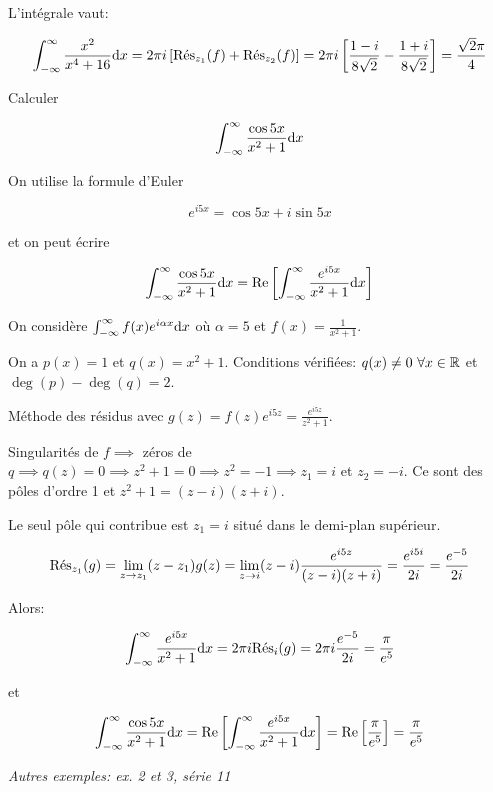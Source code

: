 \begin{enumerate}
\begin{example}[1]
L'intégrale vaut:

\[
    \int_{-\infty}^\infty \frac{x^2}{x^4 + 16} \dx
    = 2 \pi i \left[ \Res_{z_1}(f) + \Res_{z_2}(f) \right]
    = 2 \pi i \left[ \frac{1 - i}{8\sqrt{2}} - \frac{1 + i}{8\sqrt{2}} \right] = \frac{\sqrt{2}\pi}{4}
\]

\end{example}


\begin{example}[2]
    Calculer
    
    \[ \int_{-\infty}^\infty \frac{\cos 5x}{x^2 + 1} \dx \]
    
    On utilise la formule d'Euler
    
    \[ e^{i5x} = \cos 5x + i \sin 5x \]
    
    et on peut écrire
    
    \[
        \int_{-\infty}^\infty \frac{\cos 5x}{x^2 + 1} \dx
        = \Rep \left[ \int_{-\infty}^\infty \frac{e^{i5x}}{x^2 + 1} \dx \right]
    \]
    
    On considère $\int_{-\infty}^\infty f(x) e^{i\alpha x} \dx$ où $\alpha = 5$ et $f(x) = \frac{1}{x^2 + 1}$.
    
    On a $p(x) = 1$ et $q(x) = x^2 + 1$.
    Conditions vérifiées: $q(x) \neq 0 \ \forall x \in \R$ et $\deg(p) - \deg(q) = 2$.
    
    Méthode des résidus avec $g(z) = f(z) e^{i5z} = \frac{e^{i5z}}{z^2 + 1}$.
    
    Singularités de $f \implies$ zéros de $q \implies q(z) = 0 \implies z^2 + 1 = 0 \implies z^2 = -1 \implies z_1 = i$ et $z_2 = -i$.
    Ce sont des pôles d'ordre 1 et $z^2 + 1 = (z - i)(z + i)$.
    
    Le seul pôle qui contribue est $z_1 = i$ situé dans le demi-plan supérieur.
    
    \[
        \Res_{z_1}(g)
        = \lim_{z \rightarrow z_1} (z - z_1) g(z)
        = \lim_{z \rightarrow i} (z - i) \frac{e^{i5z}}{(z - i)(z + i)}
        = \frac{e^{i5i}}{2i}
        = \frac{e^{-5}}{2i}
    \]
    
    Alors:
    
    \[
        \int_{-\infty}^\infty \frac{e^{i5x}}{x^2 + 1} \dx = 2\pi i \Res_i (g) = 2\pi i \frac{e^{-5}}{2i} = \frac{\pi}{e^{5}}
    \]
    
    et
    
    \[
        \int_{-\infty}^\infty \frac{\cos 5x}{x^2 + 1} \dx
        = \Rep \left[ \int_{-\infty}^\infty \frac{e^{i5x}}{x^2 + 1} \dx \right]
        = \Rep \left[ \frac{\pi}{e^{5}} \right]
        = \frac{\pi}{e^{5}}
    \]
    
    \textit{Autres exemples: ex. 2 et 3, série 11}
\end{example}

\end{enumerate}

